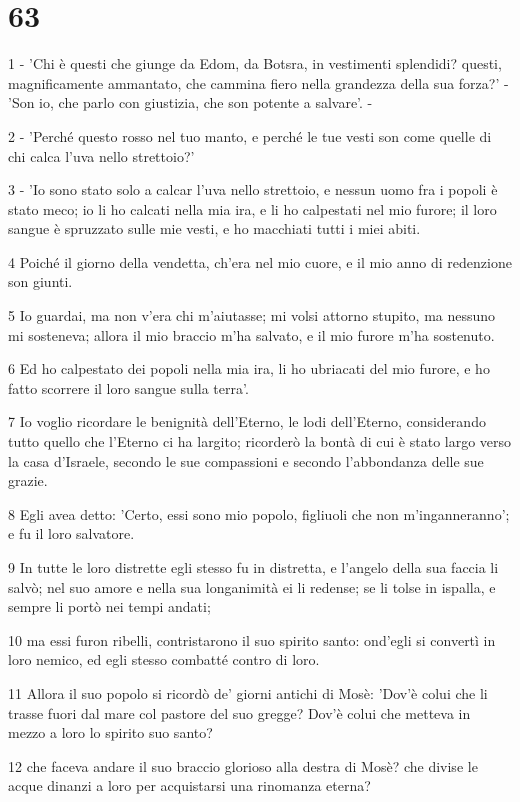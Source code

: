 \chapter{63}

\par 1 - 'Chi è questi che giunge da Edom, da Botsra, in vestimenti splendidi? questi, magnificamente ammantato, che cammina fiero nella grandezza della sua forza?' - 'Son io, che parlo con giustizia, che son potente a salvare'. -
\par 2 - 'Perché questo rosso nel tuo manto, e perché le tue vesti son come quelle di chi calca l'uva nello strettoio?'
\par 3 - 'Io sono stato solo a calcar l'uva nello strettoio, e nessun uomo fra i popoli è stato meco; io li ho calcati nella mia ira, e li ho calpestati nel mio furore; il loro sangue è spruzzato sulle mie vesti, e ho macchiati tutti i miei abiti.
\par 4 Poiché il giorno della vendetta, ch'era nel mio cuore, e il mio anno di redenzione son giunti.
\par 5 Io guardai, ma non v'era chi m'aiutasse; mi volsi attorno stupito, ma nessuno mi sosteneva; allora il mio braccio m'ha salvato, e il mio furore m'ha sostenuto.
\par 6 Ed ho calpestato dei popoli nella mia ira, li ho ubriacati del mio furore, e ho fatto scorrere il loro sangue sulla terra'.
\par 7 Io voglio ricordare le benignità dell'Eterno, le lodi dell'Eterno, considerando tutto quello che l'Eterno ci ha largito; ricorderò la bontà di cui è stato largo verso la casa d'Israele, secondo le sue compassioni e secondo l'abbondanza delle sue grazie.
\par 8 Egli avea detto: 'Certo, essi sono mio popolo, figliuoli che non m'inganneranno'; e fu il loro salvatore.
\par 9 In tutte le loro distrette egli stesso fu in distretta, e l'angelo della sua faccia li salvò; nel suo amore e nella sua longanimità ei li redense; se li tolse in ispalla, e sempre li portò nei tempi andati;
\par 10 ma essi furon ribelli, contristarono il suo spirito santo: ond'egli si convertì in loro nemico, ed egli stesso combatté contro di loro.
\par 11 Allora il suo popolo si ricordò de' giorni antichi di Mosè: 'Dov'è colui che li trasse fuori dal mare col pastore del suo gregge? Dov'è colui che metteva in mezzo a loro lo spirito suo santo?
\par 12 che faceva andare il suo braccio glorioso alla destra di Mosè? che divise le acque dinanzi a loro per acquistarsi una rinomanza eterna?

